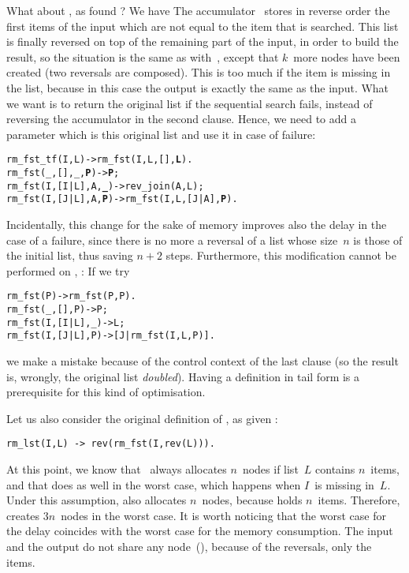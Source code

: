 What about , as found
? We have
 The accumulator~ stores in
reverse order the first items of the input which are not equal to the
item that is searched. This list is finally reversed on top of the
remaining part of the input, in order to build the result, so the
situation is the same as with~, except that
\(k\)~more nodes have been created (two reversals are composed). This
is too much if the item is missing in the list, because in this case
the output is exactly the same as the input. What we want is to return
the original list if the sequential search fails, instead of reversing
the accumulator in the second clause. Hence, we need to add a
parameter which is this original list and use it in case of failure:
\begin{alltt}
rm_fst_tf(I,L)      -> rm_fst(I,L,[],\textbf{L}).
rm_fst(_,   [],_,\textbf{P}) -> \textbf{P};\hfill% \emph{Here}
rm_fst(I,[I|L],A,\textbf{_}) -> rev_join(A,L);
rm_fst(I,[J|L],A,\textbf{P}) -> rm_fst(I,L,[J|A],\textbf{P}).
\end{alltt}
Incidentally, this change for the sake of memory improves also the
delay in the case of a failure, since there is no more a reversal of a
list whose size~\(n\) is those of the initial list, thus saving
\(n+2\) steps. Furthermore, this modification cannot be performed on
, :
 If we try
\begin{alltt}
rm_fst(P)         -> rm_fst(P,P).
rm_fst(_,   [],P) -> P;\hfill% Error
rm_fst(I,[I|L],_) -> L;
rm_fst(I,[J|L],P) -> [J|rm_fst(I,L,P)].
\end{alltt}
we make a mistake because of the control context of the last clause
(so the result is, wrongly, the original list \emph{doubled}). Having
a definition in tail form is a prerequisite for this kind of
optimisation.

Let us also consider the original definition of ,
as given :
\begin{verbatim}
rm_lst(I,L) -> rev(rm_fst(I,rev(L))).
\end{verbatim}
At this point, we know that ~always allocates
\(n\)~nodes if list~\(L\) contains \(n\)~items, and that
 does as well in the worst case,
which happens when \(I\)~is missing in~\(L\). Under this assumption,
 also allocates \(n\)~nodes,
because  holds \(n\)~items.
Therefore,  creates \(3n\)~nodes in the
worst case. It is worth noticing that the worst case for the delay
coincides with the worst case for the memory consumption. The input
and the output do not share any node~(\erlcode{|}), because of the
reversals, only the items.

